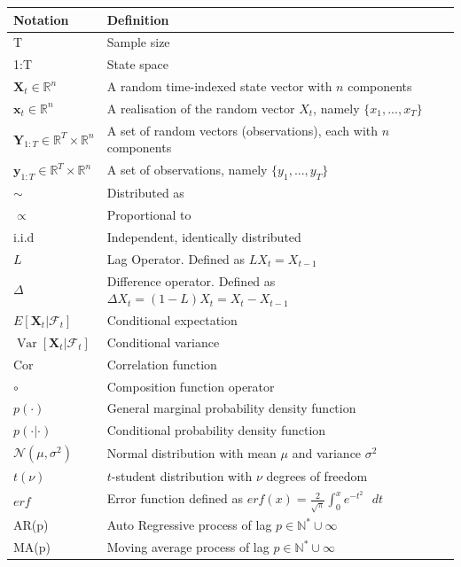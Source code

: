 \documentclass[11pt,a4,twosided,singlespacing,titlepagenumber=on]{scrreprt}
\numberwithin{equation}{chapter} %
\theoremstyle{remark}
\DeclareMathOperator{\var}{Var}
\newcommand{\matr}[1]{\mathbf{#1}}
\begin{document}
\begin{table}[h]
\centering
\begin{tabular}{ll}
\hline
\multicolumn{1}{|l|}{Notation}     & \multicolumn{1}{l|}{Definition} \\ \hline
T									& Sample size \\
1:T									& State space \\
$\matr{X}_t	\in \mathbb{R}^n$				& A random time-indexed state vector with $n$ components \\
$\matr{x}_t	\in \mathbb{R}^n$				& A realisation of the random vector $X_t$, namely $\{x_1,...,x_T \}$ \\
$\matr{Y}_{1:T} \in \mathbb{R}^T \times \mathbb{R}^n$  		& A set of random vectors (observations), each with $n$ components \\
$\matr{y}_{1:T} \in \mathbb{R}^T \times \mathbb{R}^n $  		& A set of observations, namely $\{y_1,...,y_T \}$ \\
$\sim$								& Distributed as \\
$\propto$							& Proportional to \\
i.i.d								& Independent, identically distributed \\
$L$									& Lag Operator. Defined as $L X_t = X_{t-1}$ \\
$\Delta$							& Difference operator. Defined as $\Delta X_t = (1-L) X_t = X_t - X_{t-1}$ \\
$E[\matr{X}_t | \mathcal{F}_t]$			& Conditional expectation \\
$\var[\matr{X}_t | \mathcal{F}_t]$			& Conditional variance \\
Cor									& Correlation function \\
$\circ$								& Composition function operator \\
$p(\cdot)$							& General marginal probability density function \\
$p(\cdot| \cdot)$					& Conditional probability density function \\
$\mathcal{N}(\mu, \sigma^2)$		& Normal distribution with mean $\mu$ and variance $\sigma^2$ \\
$t(\nu)$							& $t$-student distribution with $\nu$ degrees of freedom \\
$erf$								& Error function defined as $erf(x) = \frac{2}{\sqrt{\pi}} \int_0^x e^{-t^2}\text{ }dt$ \\
AR(p)									& Auto Regressive process of lag $p \in \mathbb{N}^* \cup \infty$ \\
MA(p)  								& Moving average process of lag $p \in \mathbb{N}^* \cup \infty$ \\
\hline
\end{tabular}
\end{table}
\end{document}
